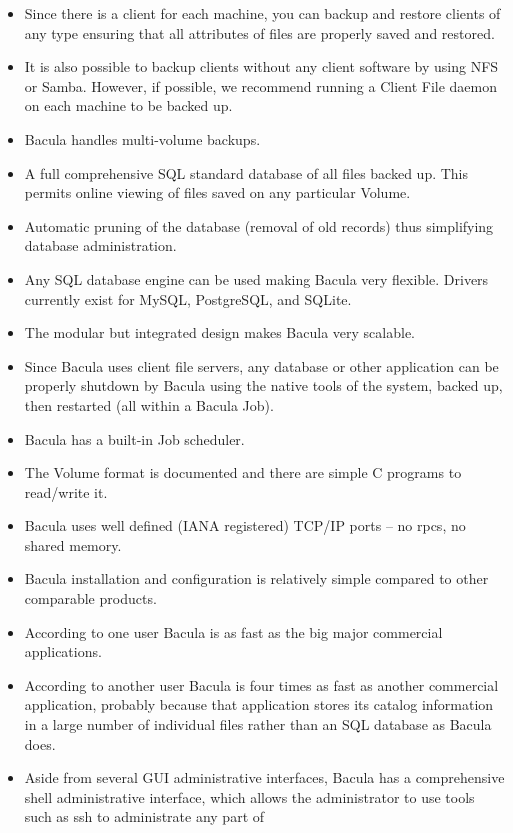 \begin{itemize}
\item Since there is a client for each machine, you can backup
   and restore clients of any type ensuring that all attributes
   of files are properly saved and restored.
\item It is also possible to backup clients without any client
   software by using NFS or Samba.  However, if possible, we
   recommend running a Client File daemon on each machine to be
   backed up.
\item Bacula handles multi-volume backups.  
\item A full comprehensive SQL standard database of all files backed up.  This
   permits online viewing of files saved on any particular  Volume.  
\item Automatic pruning of the database (removal of old records) thus 
   simplifying database administration.  
\item Any SQL database engine can be used making Bacula very flexible.  
      Drivers currently exist for MySQL, PostgreSQL, and SQLite.
\item The modular but integrated design makes Bacula very scalable.  
\item Since Bacula uses client file servers, any database or
   other application can be properly shutdown by Bacula using the
   native tools of the system, backed up, then restarted (all
   within a Bacula Job).
\item Bacula has a built-in Job scheduler.  
\item The Volume format is documented and there are simple C programs to 
   read/write it.  
\item Bacula uses well defined (IANA registered) TCP/IP ports -- no rpcs,  no
   shared memory.  
\item Bacula installation and configuration is relatively simple compared  to
   other comparable products.  
\item According to one user Bacula is as fast as the big major commercial 
   applications.  
\item According to another user Bacula is four times as fast as another
   commercial application, probably because that application  stores its catalog
   information in a large number of individual  files rather than an SQL database
   as Bacula does.  
\item Aside from several GUI administrative interfaces, Bacula has a
   comprehensive shell administrative interface, which allows the
   administrator to use tools such as ssh to administrate any part of

\end{itemize}
